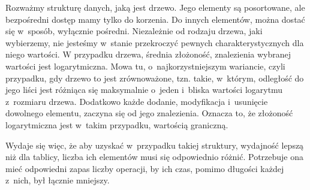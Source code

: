 Rozważmy strukturę danych, jaką jest drzewo. Jego elementy są posortowane, ale bezpośredni dostęp mamy tylko do korzenia. Do innych elementów, można dostać się w~sposób, wyłącznie pośredni. Niezależnie od rodzaju drzewa, jaki wybierzemy, nie jesteśmy w~stanie przekroczyć pewnych charakterystycznych dla niego wartości. W przypadku drzewa, średnia złożoność, znalezienia wybranej wartości jest logarytmiczna. Mowa tu, o~najkorzystniejszym wariancie, czyli przypadku, gdy drzewo to jest zrównoważone, tzn. takie, w~którym, odległość do jego liści jest różniąca się maksymalnie o~jeden i~bliska wartości logarytmu z~rozmiaru drzewa. Dodatkowo każde dodanie, modyfikacja i~usunięcie dowolnego elementu, zaczyna się od jego znalezienia. Oznacza to, że złożoność logarytmiczna jest w~takim przypadku, wartością graniczną.

Wydaje się więc, że aby uzyskać w~przypadku takiej struktury, wydajność lepszą niż dla tablicy, liczba ich elementów musi się odpowiednio różnić. Potrzebuje ona mieć odpowiedni zapas liczby operacji, by ich czas, pomimo długości każdej z~nich, był łącznie mniejszy.	
